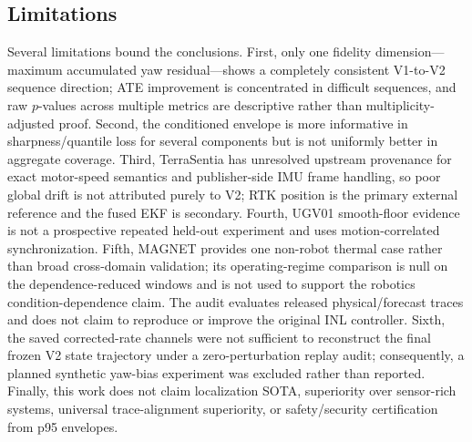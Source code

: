 \documentclass[journal]{IEEEtran}
\begin{document}
\subsection{Limitations}
Several limitations bound the conclusions. First, only one fidelity dimension---maximum accumulated yaw residual---shows a completely consistent V1-to-V2 sequence direction; ATE improvement is concentrated in difficult sequences, and raw $p$-values across multiple metrics are descriptive rather than multiplicity-adjusted proof. Second, the conditioned envelope is more informative in sharpness/quantile loss for several components but is not uniformly better in aggregate coverage. Third, TerraSentia has unresolved upstream provenance for exact motor-speed semantics and publisher-side IMU frame handling, so poor global drift is not attributed purely to V2; RTK position is the primary external reference and the fused EKF is secondary. Fourth, UGV01 smooth-floor evidence is not a prospective repeated held-out experiment and uses motion-correlated synchronization. Fifth, MAGNET provides one non-robot thermal case rather than broad cross-domain validation; its operating-regime comparison is null on the dependence-reduced windows and is not used to support the robotics condition-dependence claim. The audit evaluates released physical/forecast traces and does not claim to reproduce or improve the original INL controller. Sixth, the saved corrected-rate channels were not sufficient to reconstruct the final frozen V2 state trajectory under a zero-perturbation replay audit; consequently, a planned synthetic yaw-bias experiment was excluded rather than reported. Finally, this work does not claim localization SOTA, superiority over sensor-rich systems, universal trace-alignment superiority, or safety/security certification from p95 envelopes.
\end{document}
